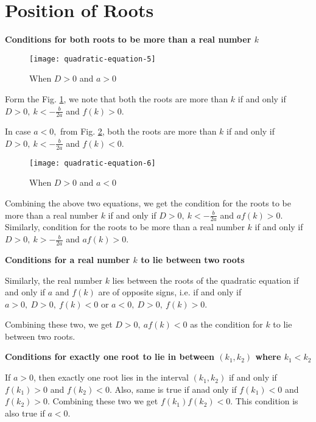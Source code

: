 \section{Position of Roots}
\textbf{Conditions for both roots to be more than a real number $k$}

\begin{figure}[H]
  \begin{center}
    \texttt{[image: quadratic-equation-5]}
    \caption{When $D > 0$ and $a > 0$}
    \label{fig:5}
  \end{center}
\end{figure}

Form the Fig. \ref{fig:5}, we note that both the roots are more than $k$ if and only if $D>0,~k<-\frac{b}{2a}$ and $f(k)>0$.

In case $a< 0,$ from Fig. \ref{fig:6}, both the roots are more than $k$ if and only if $D>0,~k<-\frac{b}{2a}$ and $f(k)<0$.

\begin{figure}[H]
  \begin{center}
    \texttt{[image: quadratic-equation-6]}
    \caption{When $D > 0$ and $a < 0$}
    \label{fig:6}
  \end{center}
\end{figure}

Combining the above two equations, we get the condition for the roots to be more than a real number $k$ if and only if
$D>0,~k<-\frac{b}{2a}$ and $af(k)>0$. Similarly, condition for the roots to be more than a real number $k$ if and only if
$D>0,~k>-\frac{b}{2a}$ and $af(k)>0$.

\noindent\textbf{Conditions for a real number $k$ to lie between two roots}

Similarly, the real number $k$ lies between the roots of the quadratic equation if and only if $a$ and $f(k)$ are of opposite
signs, i.e. if and only if $a>0,~D>0,~f(k) < 0$ or $a< 0,~D>0,~f(k)>0$.

Combining these two, we get $D>0,~af(k) < 0$ as the condition for $k$ to lie between two roots.

\noindent\textbf{Conditions for exactly one root to lie in between $(k_1, k_2)$ where $k_1<k_2$}

If $a>0$, then exactly one root lies in the interval $(k_1, k_2)$ if and only if $f(k_1)>0$ and $f(k_2)<0$. Also, same is true if
anad only if $f(k_1)<0$ and $f(k_2)>0$. Combining these two we get $f(k_1)f(k_2) < 0$. This condition is also true if $a<0$.

